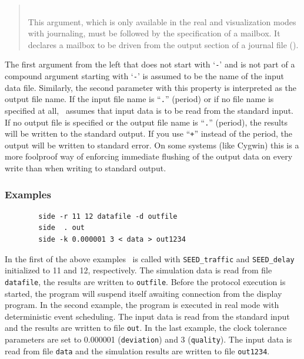 \begin{quote}
\noindent{}\\ \hspace{0in}
This argument, which is only available in the real and visualization
modes with journaling, must be followed
by the specification of a mailbox.
It declares a mailbox to be driven from the output section of a journal
file ().
\end{quote}
\medskip

The first argument from the left that does not start with `{\tt -}' and is not
part of a compound argument starting with `{\tt -}'
is assumed to be the name of the input data file.
Similarly, the
second parameter with this property is interpreted as the output file name.
If the input file name is ``{\tt .}'' (period) or if no file name is
specified at all, \smurph\ assumes that input data is to be read from the
standard input.
If no output file is specified or the output file name is ``{\tt .}'' (period),
the results will be written to the standard output.
If you use ``{\tt +}'' instead of the period, the output will be written to
standard error.
On some systems (like Cygwin) this is a more foolproof way of enforcing
immediate flushing
of the output data on every write than when writing to standard
output.

\subsubsection*{Examples}

\noindent
\begin{verbatim}
        side -r 11 12 datafile -d outfile
        side  . out
        side -k 0.000001 3 < data > out1234
\end{verbatim}

In the first of the above examples \smurphtts\ is called
with {\tt SEED\_traffic}
and {\tt SEED\_delay} initialized to 11 and 12, respectively.
The simulation
data is read from file {\tt datafile}, the results are written to {\tt outfile}.
Before the protocol execution is started, the program will suspend itself
awaiting connection from the display program.
In the second example, the program is executed in real mode with
deterministic event scheduling.
The input data is read from the standard
input and the results are written to file {\tt out}.
In the last example, the clock tolerance parameters are set to
0.000001 ({\tt deviation}) and 3 ({\tt quality}).
The input data is read from file {\tt data} and the simulation results
are written to file {\tt out1234}.

